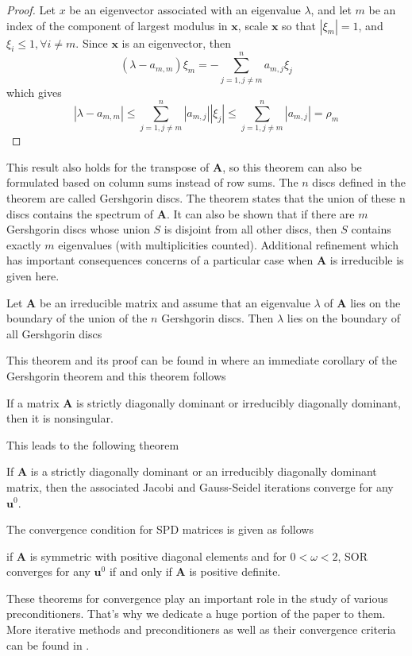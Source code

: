 \begin{proof}
Let $x$ be an eigenvector associated with an eigenvalue $\lambda$, and let $m$ be an index of the component of largest modulus in $\boldsymbol{x}$, scale $\boldsymbol{x}$ so that $|\xi_m| = 1$, and $\xi_i \leq 1, \forall i \neq m$. Since $\boldsymbol{x}$ is an eigenvector, then
\begin{equation}
    (\lambda - a_{m,m})\xi_m = - \sum_{j = 1, j \neq m}^{n}a_{m,j}\xi_j
\end{equation}
which gives
\begin{equation}
    |\lambda - a_{m,m}| \leq \sum_{j = 1, j \neq m}^{n}|a_{m,j}||\xi_j| \leq \sum_{j = 1, j \neq m}^{n}|a_{m,j}| = \rho_m
\end{equation}
\end{proof}
This result also holds for the transpose of $\boldsymbol{A}$, so this theorem can also be formulated based on column sums instead of row sums.
The $n$ discs defined in the theorem are called Gershgorin discs. The theorem states that the union of these n discs contains the spectrum of $\boldsymbol{A}$. It can also be shown that if there are $m$ Gershgorin discs whose union $S$ is disjoint from all other discs, then $S$ contains exactly $m$ eigenvalues (with multiplicities counted). 
Additional refinement which has important consequences concerns of a particular case when $\boldsymbol{A}$ is irreducible is given here.
\begin{theorem}
Let $\boldsymbol{A}$ be an irreducible matrix and assume that an eigenvalue $\lambda$ of $\boldsymbol{A}$ lies on the boundary of the union of the $n$ Gershgorin discs. Then $\lambda$ lies on the boundary of all Gershgorin discs
\end{theorem}
This theorem and its proof can be found in \cite{saad2003iterative} where an immediate corollary of the Gershgorin theorem and this theorem follows
\begin{corollary}
If a matrix $\boldsymbol{A}$ is strictly diagonally dominant or irreducibly diagonally dominant, then it is nonsingular.
\end{corollary}
This leads to the following theorem
\begin{theorem}
If $\boldsymbol{A}$ is a strictly diagonally dominant or an irreducibly diagonally dominant matrix, then the associated Jacobi and Gauss-Seidel iterations converge for any $\boldsymbol{u}^0$.
\end{theorem}
The convergence condition for SPD matrices is given as follows
\begin{theorem}
if $\boldsymbol{A}$ is symmetric with positive diagonal elements and for $0 < \omega < 2$, SOR converges for any $\boldsymbol{u}^0$ if and only if $\boldsymbol{A}$ is positive definite. 
\end{theorem}
These theorems for convergence play an important role in the study of various preconditioners. That's why we dedicate a huge portion of the paper to them. More iterative methods and preconditioners as well as their convergence criteria can be found in \cite{saad2003iterative}.